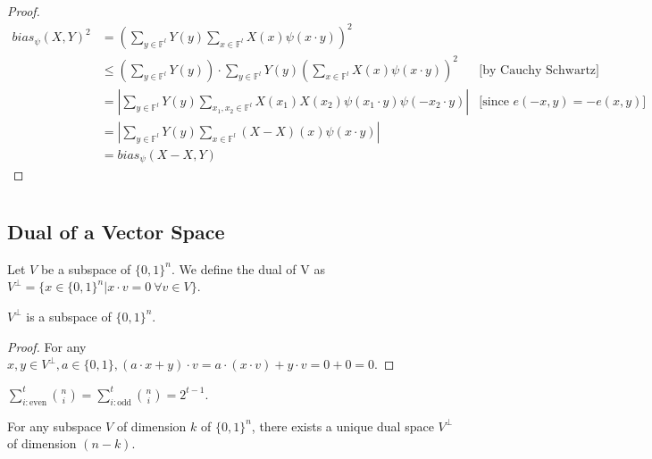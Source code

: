 \begin{proof}
\begin{align*}
bias_\psi(X,Y)^2
& = \left( \sum\limits_{y \in \mathbb{F}^l} Y(y) \sum\limits_{x \in \mathbb{F}^l} X(x) \psi(x \cdot y)\right)^2\\
& \leq \left( \sum\limits_{y \in \mathbb{F}^l} Y(y) \right) \cdot 
	   \sum\limits_{y \in \mathbb{F}^l} Y(y) \left( \sum\limits_{x \in \mathbb{F}^l} X(x) \psi(x \cdot y)\right)^2 & \text{[by Cauchy Schwartz]} \\
& = \left| \sum\limits_{y \in \mathbb{F}^l} Y(y)  \sum\limits_{x_1, x_2 \in \mathbb{F}^l} X(x_1) X(x_2) \psi(x_1 \cdot y) \psi(-x_2 \cdot y) \right| &\text{[since } e(-x,y) = -e(x,y)]\\
& = \left| \sum\limits_{y \in \mathbb{F}^l} Y(y) \sum\limits_{x \in \mathbb{F}^l} (X - X)(x) \psi(x \cdot y) \right| \\
&= bias_\psi(X - X, Y)
\end{align*}
\end{proof}
\appendix

\chapter{}
\section{Dual of a Vector Space}
\begin{definition} 
Let $V$ be a subspace of $\{0,1\}^n$. 
We define the dual of V as 
$V^\perp = \{ x \in \{ 0,1 \}^n | x \cdot v = 0 \ \forall v \in V \}$.
\end{definition}

\begin{theorem}
$V^\perp$ is a subspace of $\{ 0,1 \}^n$.
\end{theorem}

\begin{proof}
For any $x, y \in V^\perp, a \in \{0,1\}, (a \cdot x+y)\cdot v = a \cdot (x \cdot v) + y \cdot v = 0 + 0 = 0$. 
\end{proof} 

\begin{lemma} $\sum \limits_{i: \text{even}}^t {n \choose i} = 
\sum \limits_{i: \text{odd}}^t {n \choose i} = 2^{t-1} $.
\end{lemma}

\begin{theorem} For any subspace $V$ of dimension $k$ of $\{ 0,1 \}^n$, 
there exists a unique dual space $V^\perp$ of dimension $(n-k)$.
\end{theorem}


